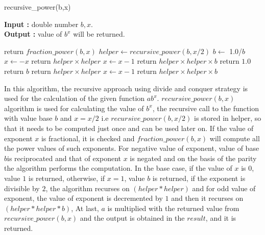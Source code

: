 \documentclass[12pt, a4paper]{article}
\begin{document}
\begin{algorithm}[hbt!]
\caption{recursive\_power(b,x)}\label{alg:two}

\hspace*{\algorithmicindent} \textbf{Input : }double number $b,x$. \\
\hspace*{\algorithmicindent} \textbf{Output : }value of $b^x$ will be returned.
\begin{algorithmic}[1]
  \STATE return $ fraction\_power(b,x) $
\ENDIF
\STATE $helper \gets recursive\_power(b,x/2)$
  \STATE $ b  \gets $ 1.0/$ b $
  \STATE $ x  \gets  - x $
  \STATE return $helper \times helper$
  \ELSE
  \STATE $x \gets x - 1$
  \STATE return $helper \times helper \times b$
\ENDIF
{}
  \STATE return $1.0$
  \STATE return $b$
  \STATE return $helper \times helper$
\ELSE
  \STATE $x \gets x - 1$
  \STATE return $helper \times helper \times b$
\ENDIF
\end{algorithmic}
\end{algorithm}

In this algorithm, the recursive approach using divide and conquer strategy is used for the calculation of the given function $ab^x$. $recursive\_power(b,x)$ algorithm is used for calculating the value of $b^x$, the recursive call to the function with value base $b$ and $x = x/2$ i.e $recursive\_power(b,x/2)$ is stored in helper, so that it needs to be computed just once and can be used later on. If the value of exponent $x$ is fractional, it is checked and $fraction\_power(b,x)$ will compute all the power values of such exponents. For negative value of exponent, value of base $b$is reciprocated and that of exponent $x$ is negated and on the basis of the parity the algorithm performs the computation. In the base case, if the value of $x$ is 0, value $1$ is returned, otherwise, if $x=1$, value $b$ is returned, if the exponent is divisible by $2$, the algorithm recurses on $(helper * helper)$ and for odd value of exponent, the value of exponent is decremented by $1$ and then it recurses on $(helper * helper * b)$,  At last, $a$ is multiplied with the returned value from $recursive\_power(b,x)$ and the output is obtained in the $result$, and it is returned.
\end{document}
